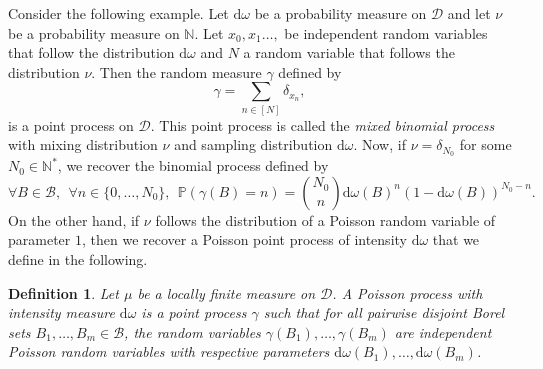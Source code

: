 \documentclass[twoside,11pt]{book}
\newtheorem{definition}{Definition}
\newtheorem{example}{Example}
\numberwithin{theorem}{chapter}
\numberwithin{definition}{chapter}
\numberwithin{proposition}{chapter}
\numberwithin{corollary}{chapter}
\numberwithin{example}{chapter}
\numberwithin{lemma}{chapter}
\numberwithin{assumption}{chapter}
\numberwithin{equation}{chapter}
\numberwithin{figure}{chapter}
\begin{document}
Consider the following example. Let $\mathrm{d}\omega$ be a probability measure on $\mathcal{D}$ and let $\nu$ be a probability measure on $\mathbb{N}$. Let $x_{0}, x_{1} \dots, $ be independent random variables that follow the distribution $\mathrm{d}\omega$ and $N$ a random variable that follows the distribution $\nu$.
Then the random measure $\gamma$ defined by
\begin{equation}
\gamma = \sum\limits_{n \in [N]} \delta_{x_{n}},
\end{equation}
is a point process on $\mathcal{D}$. This point process is called the \emph{mixed binomial process} with mixing distribution $\nu$ and sampling distribution $\mathrm{d}\omega$.
Now, if  $\nu = \delta_{N_0}$ for some $N_0 \in \mathbb{N}^{*}$, we recover the binomial process defined by
\begin{equation}\label{eq:binomial_cylinder_prb}
\forall B \in \mathcal{B}, \:\:\forall n \in \{0, \dots, N_0\}, \:\: \mathbb{P}(\gamma(B) = n) = \binom{N_0}{n}\mathrm{d}\omega(B)^{n}(1-\mathrm{d}\omega(B))^{N_0-n}.
\end{equation}
On the other hand, if $\nu$ follows the distribution of a Poisson random variable of parameter $1$, then we recover a Poisson point process of intensity $\mathrm{d}\omega$ that we define in the following.
\begin{definition}
Let $\mu$ be a locally finite measure on $\mathcal{D}$. A Poisson process with intensity measure $\mathrm{d}\omega$ is a point process $\gamma$ such that for all pairwise disjoint Borel sets $B_{1}, \dots, B_{m} \in \mathcal{B}$, the random variables $\gamma(B_{1}), \dots, \gamma(B_{m})$ are independent Poisson random variables with respective parameters $\mathrm{d}\omega(B_{1}), \dots, \mathrm{d}\omega(B_{m})$.

\end{definition}
\end{document}
